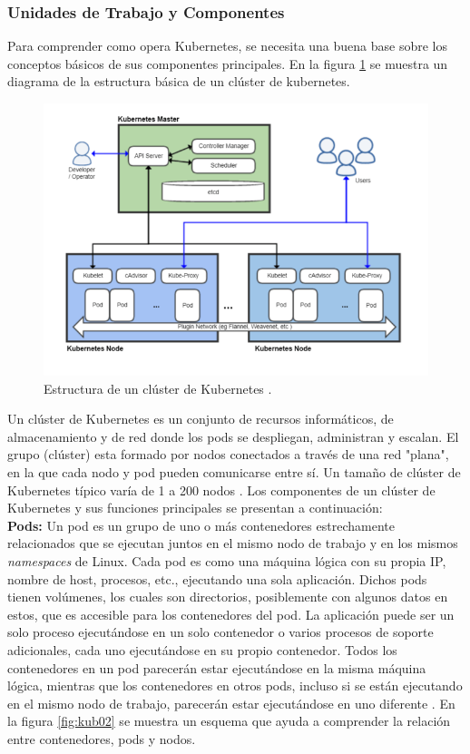 \subsubsection{Unidades de Trabajo y Componentes}
\par Para comprender como opera Kubernetes, se necesita una buena base sobre los conceptos básicos de sus componentes principales. En la figura \ref{fig:kub01} se muestra un diagrama de la estructura básica de un clúster de kubernetes.  \\ 
\vspace{\baselineskip}
\begin{figure}[htpb!]
	\centering
	\includegraphics[width=0.8\columnwidth]{images/kubernetes01.png}
	\caption{Estructura de un clúster de Kubernetes \cite{BOOK02}.}
	\label{fig:kub01}
\end{figure}
\par Un clúster de Kubernetes es un conjunto de recursos informáticos, de almacenamiento y de red donde los pods se despliegan, administran y escalan. El grupo (clúster) esta formado por nodos conectados a través de una red "plana", en la que cada nodo y pod pueden comunicarse entre sí. Un tamaño de clúster de Kubernetes típico varía de 1 a 200 nodos \cite{BOOK04}. Los componentes de un clúster de Kubernetes y sus funciones principales se presentan a continuación:\\ 

\textbf{Pods:} Un pod es un grupo de uno o más contenedores estrechamente relacionados que se ejecutan juntos en el mismo nodo de trabajo y en los mismos \textit{namespaces} de Linux. Cada pod es como una máquina lógica con su propia IP, nombre de host, procesos, etc., ejecutando una sola aplicación. Dichos pods tienen volúmenes, los cuales son directorios, posiblemente con algunos datos en estos, que es accesible para los contenedores del pod. La aplicación puede ser un solo proceso ejecutándose en un solo contenedor o varios procesos de soporte adicionales, cada uno ejecutándose en su propio contenedor. Todos los contenedores en un pod parecerán estar ejecutándose en la misma máquina lógica, mientras que los contenedores en otros pods, incluso si se están ejecutando en el mismo nodo de trabajo, parecerán estar ejecutándose en uno diferente  \cite{BOOK01}. En la figura \ref{fig:kub02} se muestra un esquema que ayuda a comprender la relación entre contenedores, pods y nodos. \\


